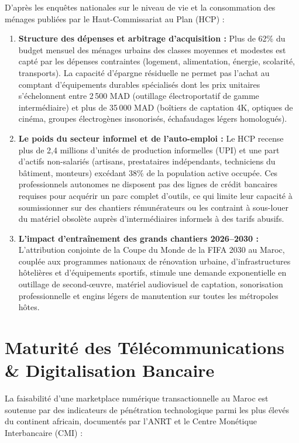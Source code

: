 \documentclass[11pt,a4paper]{report}
\begin{document}
D'après les enquêtes nationales sur le niveau de vie et la consommation des ménages publiées par le Haut-Commissariat au Plan (HCP) :
\begin{enumerate}[leftmargin=*]
    \item \textbf{Structure des dépenses et arbitrage d'acquisition :} Plus de 62\% du budget mensuel des ménages urbains des classes moyennes et modestes est capté par les dépenses contraintes (logement, alimentation, énergie, scolarité, transports). La capacité d'épargne résiduelle ne permet pas l'achat au comptant d'équipements durables spécialisés dont les prix unitaires s'échelonnent entre 2\,500 MAD (outillage électroportatif de gamme intermédiaire) et plus de 35\,000 MAD (boîtiers de captation 4K, optiques de cinéma, groupes électrogènes insonorisés, échafaudages légers homologués).
    \item \textbf{Le poids du secteur informel et de l'auto-emploi :} Le HCP recense plus de 2,4 millions d'unités de production informelles (UPI) et une part d'actifs non-salariés (artisans, prestataires indépendants, techniciens du bâtiment, monteurs) excédant 38\% de la population active occupée. Ces professionnels autonomes ne disposent pas des lignes de crédit bancaires requises pour acquérir un parc complet d'outils, ce qui limite leur capacité à soumissionner sur des chantiers rémunérateurs ou les contraint à sous-louer du matériel obsolète auprès d'intermédiaires informels à des tarifs abusifs.
    \item \textbf{L'impact d'entraînement des grands chantiers 2026--2030 :} L'attribution conjointe de la Coupe du Monde de la FIFA 2030 au Maroc, couplée aux programmes nationaux de rénovation urbaine, d'infrastructures hôtelières et d'équipements sportifs, stimule une demande exponentielle en outillage de second-œuvre, matériel audiovisuel de captation, sonorisation professionnelle et engins légers de manutention sur toutes les métropoles hôtes.
\end{enumerate}

\section{Maturité des Télécommunications \& Digitalisation Bancaire}
La faisabilité d'une marketplace numérique transactionnelle au Maroc est soutenue par des indicateurs de pénétration technologique parmi les plus élevés du continent africain, documentés par l'ANRT et le Centre Monétique Interbancaire (CMI) :
\end{document}
